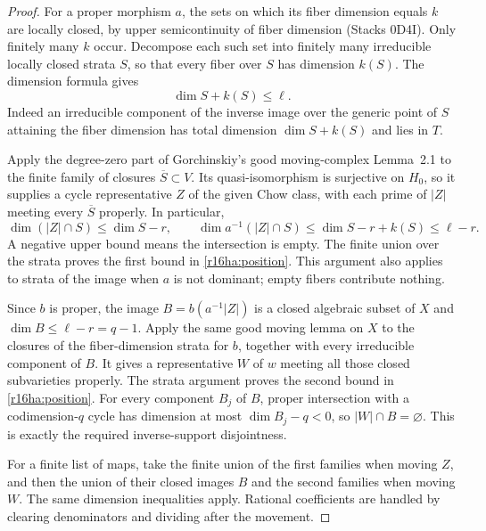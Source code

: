 \documentclass[11pt,a4paper]{article}
\theoremstyle{definition}
\theoremstyle{remark}
\numberwithin{equation}{section}
\begin{document}
\begin{proof}
For a proper morphism $a$, the sets on which its fiber dimension
equals $k$ are locally closed, by upper semicontinuity of fiber
dimension (Stacks 0D4I). Only finitely many $k$ occur. Decompose
each such set into finitely many irreducible locally closed strata
$S$, so that every fiber over $S$ has dimension $k(S)$.
The dimension formula gives
\[
                        \dim S+k(S)\leq\ell.
 \tag{HA16.2}\label{r16ha:dimension-bound}
\]
Indeed an irreducible component of the inverse image over the
generic point of $S$ attaining the fiber dimension has total
dimension $\dim S+k(S)$ and lies in $T$.

Apply the degree-zero part of Gorchinskiy's good moving-complex
Lemma~2.1 to the finite family of closures $\overline S\subset V$.
Its quasi-isomorphism is surjective on $H_0$, so it supplies a
cycle representative $Z$ of the given Chow class, with each
prime of $|Z|$ meeting every $\overline S$ properly. In particular,
\[
 \dim(|Z|\cap S)\leq\dim S-r,
 \qquad
 \dim a^{-1}(|Z|\cap S)
       \leq\dim S-r+k(S)\leq\ell-r.
\]
A negative upper bound means the intersection is empty.
The finite union over the strata proves the first bound in
\eqref{r16ha:position}. This argument also applies to strata of
the image when $a$ is not dominant; empty fibers contribute nothing.

Since $b$ is proper, the image
$B=b(a^{-1}|Z|)$ is a closed algebraic subset of $X$ and
$\dim B\leq\ell-r=q-1$. Apply the same good moving lemma on
$X$ to the closures of the fiber-dimension strata for $b$,
together with every irreducible component of $B$. It gives a
representative $W$ of $w$ meeting all those closed subvarieties
properly. The strata argument proves the second bound in
\eqref{r16ha:position}. For every component $B_j$ of $B$,
proper intersection with a codimension-$q$ cycle has dimension
at most $\dim B_j-q<0$, so $|W|\cap B=\varnothing$.
This is exactly the required inverse-support disjointness.

For a finite list of maps, take the finite union of the first
families when moving $Z$, and then the union of their closed
images $B$ and the second families when moving $W$. The same
dimension inequalities apply. Rational coefficients are handled
by clearing denominators and dividing after the movement.
\end{proof}
\end{document}
